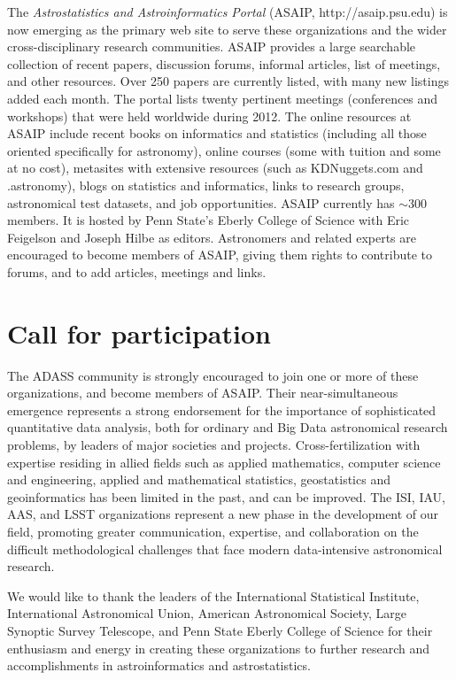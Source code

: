 The {\it {}Astrostatistics and Astroinformatics Portal} (ASAIP, http://asaip.psu.edu) is now emerging as the primary web site to serve these organizations and the wider cross-disciplinary research communities.  ASAIP provides a large searchable collection of recent papers, discussion forums, informal articles, list of meetings, and other resources.  Over 250 papers are currently listed, with many new listings added each month.  The portal lists twenty pertinent meetings (conferences and workshops) that were held worldwide during 2012.  The online resources at ASAIP include recent books on informatics and statistics (including all those oriented specifically for astronomy), online courses (some with tuition and some at no cost), metasites with extensive resources (such as KDNuggets.com and .astronomy), blogs on statistics and informatics, links to research groups, astronomical test datasets, and job opportunities.  ASAIP currently has $\sim$300 members.  It is hosted by Penn State's Eberly College of Science with Eric Feigelson and Joseph Hilbe as editors.  Astronomers and related experts are encouraged to become members of ASAIP, giving them rights to contribute to forums, and to add articles, meetings and links.   

\section{Call for participation}

The ADASS community is strongly encouraged to join one or more of these organizations, and become members of ASAIP.  Their near-simultaneous emergence represents a strong endorsement for the importance of sophisticated quantitative data analysis, both for ordinary and Big Data astronomical research problems, by leaders of major  societies and projects.    Cross-fertilization with expertise residing in allied fields such as applied mathematics, computer science and engineering, applied and mathematical statistics, geostatistics and geoinformatics has been limited in the past, and can be improved. The ISI, IAU, AAS, and LSST organizations represent a new phase in the development of our field, promoting greater communication, expertise, and collaboration on the difficult methodological challenges that face modern data-intensive astronomical research.

\bigskip

\acknowledgements We would like to thank the leaders of the International Statistical Institute, International Astronomical Union, American Astronomical Society, Large Synoptic Survey Telescope, and Penn State Eberly College of Science for their enthusiasm and energy in creating these organizations to further research and accomplishments in astroinformatics and astrostatistics. 




